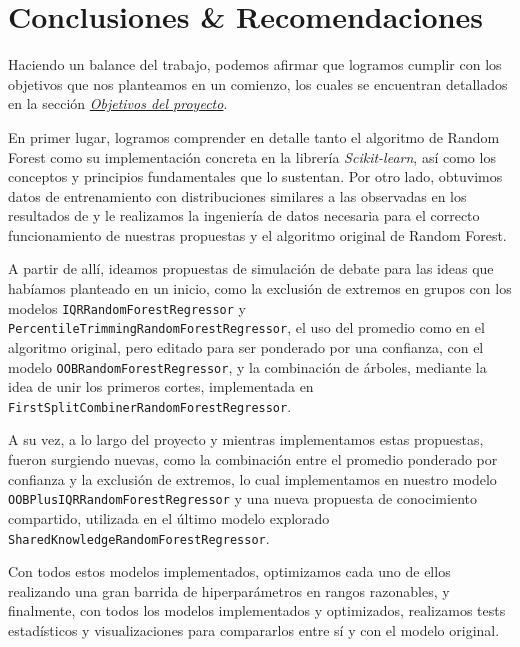 %
\chapter{Conclusiones \& Recomendaciones}
\label{ch::capitulo9}

Haciendo un balance del trabajo, podemos afirmar que logramos cumplir con los objetivos que nos planteamos en un comienzo, los cuales se encuentran detallados en la sección \hyperref[ch::capitulo3]{\textit{Objetivos del proyecto}}. 

En primer lugar, logramos comprender en detalle tanto el algoritmo de Random Forest como su implementación concreta en la librería \textit{Scikit-learn}, así como los conceptos y principios fundamentales que lo sustentan. Por otro lado, obtuvimos datos de entrenamiento con distribuciones similares a las observadas en los resultados de \cite{navajasAggregatedKnowledge} y le realizamos la ingeniería de datos necesaria para el correcto funcionamiento de nuestras propuestas y el algoritmo original de Random Forest. 

A partir de allí, ideamos propuestas de simulación de debate para las ideas que habíamos planteado en un inicio, como la exclusión de extremos en grupos con los modelos \texttt{IQRRandomForestRegressor} y \texttt{PercentileTrimmingRandomForestRegressor}, el uso del promedio como en el algoritmo original, pero editado para ser ponderado por una confianza, con el modelo \texttt{OOBRandomForestRegressor}, y la combinación de árboles, mediante la idea de unir los primeros cortes, implementada en \texttt{FirstSplitCombinerRandomForestRegressor}. 

A su vez,  a lo largo del proyecto y mientras implementamos estas propuestas, fueron surgiendo nuevas, como la combinación entre el promedio ponderado por confianza y la exclusión de extremos, lo cual implementamos en nuestro modelo \texttt{OOBPlusIQRRandomForestRegressor} y una nueva propuesta de conocimiento compartido, utilizada en el último modelo explorado \texttt{SharedKnowledgeRandomForestRegressor}.

Con todos estos modelos implementados, optimizamos cada uno de ellos realizando una gran barrida de hiperparámetros en rangos razonables, y finalmente, con todos los modelos implementados y optimizados, realizamos tests estadísticos y visualizaciones para compararlos entre sí y con el modelo original.


